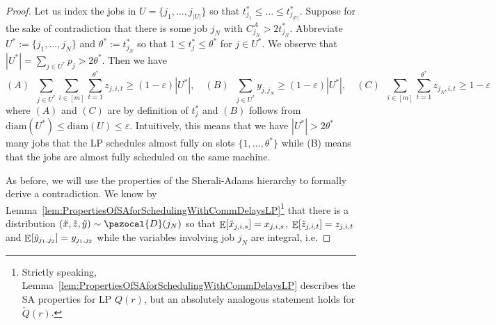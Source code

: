 \begin{proof}
  Let us index the jobs in $U = \{ j_1,\ldots,j_{|U|}\}$ so that $t_{j_1}^* \leq \ldots \leq t_{j_{|U|}}^*$.
  Suppose for the sake of contradiction that there is some job $j_N$ with $C_{j_N}^A > 2 t_{j_N}^*$.
  Abbreviate $U^* := \{ j_1,\ldots,j_N\}$ and $\theta^* := t_{j_N}^*$ so that  $1 \leq t_j^* \leq \theta^*$ for $j \in U^*$.
  We observe that $|U^*| = \sum_{j \in U^*} p_j > 2\theta^*$. Then we have
  \[
(A) \;\; \sum_{j \in U^*} \sum_{i \in [m]} \sum_{t=1}^{\theta^*} z_{j,i,t} \geq (1-\varepsilon)|U^*|, \quad (B) \;\; \sum_{j \in U^*} y_{j,j_N} \geq (1-\varepsilon)|U^*|, \quad  (C) \;\; \sum_{i \in [m]} \sum_{t=1}^{\theta^*} z_{j_N,i,t} \geq 1-\varepsilon
\]
where $(A)$ and $(C)$ are by definition of $t_j^*$ and $(B)$ follows from $\textrm{diam}(U^*) \leq \textrm{diam}(U) \leq \varepsilon$.
Intuitively, this means that we have $|U^*| > 2\theta^*$ many jobs that the LP schedules almost fully
on slots $\{1,\ldots,\theta^*\}$ while (B) means that the jobs are almost fully scheduled on the same machine.

As before, we will use the properties of the Sherali-Adams hierarchy to formally derive a contradiction.
We know by Lemma~\ref{lem:PropertiesOfSAforSchedulingWithCommDelaysLP}\footnote{Strictly speaking, Lemma~\ref{lem:PropertiesOfSAforSchedulingWithCommDelaysLP} describes the SA properties for LP $Q(r)$, but an absolutely analogous statement holds for $\tilde{Q}(r)$.} that there is a distribution  $(\tilde{x},\tilde{z},\tilde{y}) \sim \pazocal{D}(j_N)$ so that $\mathop{\mathbb{E}}[\tilde{x}_{j,i,s}] = x_{j,i,s}$, $\mathop{\mathbb{E}}[\tilde{z}_{j,i,t}]=z_{j,i,t}$ and $\mathop{\mathbb{E}}[\tilde{y}_{j_1,j_2}]=y_{j_1,j_2}$ while the variables involving job $j_N$ are integral, i.e.


\end{proof}
